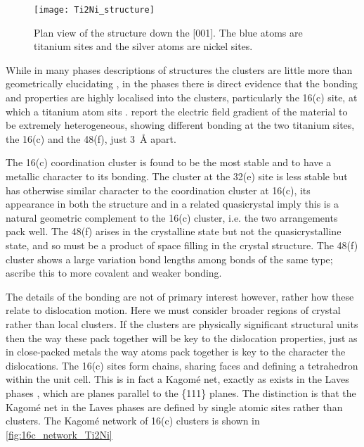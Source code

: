 \begin{figure}[h]
\centering
\texttt{[image: Ti2Ni\_structure]}
\caption[Plan view of the  structure.]{Plan view of the  structure down the [001]. The blue atoms are titanium sites and the silver atoms are nickel sites.\label{fig:Ti2Ni_plan}}
\end{figure}



While in many phases descriptions of structures the clusters are little more than geometrically elucidating \cite{Steurer2006}, in the  phases there is direct evidence that the bonding and properties are highly localised into the clusters, particularly the 16(c) site, at which a titanium atom sits \cite{Ivanovic2006}. \citet{Ivanovic2006} report the electric field gradient of the material to be extremely heterogeneous, showing different bonding at the two titanium sites, the 16(c) and the 48(f), just \SI{3}{\angstrom} apart. 

The 16(c) coordination cluster is found to be the most stable and to have a metallic character to its bonding. The cluster at the 32(e) site is less stable but has otherwise similar character to the coordination cluster at 16(c), its appearance in both the  structure and in a related quasicrystal imply this is a natural geometric complement to the 16(c) cluster, i.e. the two arrangements pack well. The 48(f) arises in the crystalline state but not the quasicrystalline state, and so must be a product of space filling in the  crystal structure. The 48(f) cluster shows a large variation bond lengths among bonds of the same type; \citet{Ivanovic2006} ascribe this to more covalent and weaker bonding.


The details of the bonding are not of primary interest however, rather how these relate to dislocation motion. Here we must consider broader regions of crystal rather than local clusters. If the clusters are physically significant structural units then the way these pack together will be key to the dislocation properties, just as in close-packed metals the way atoms pack together is key to the character the dislocations. The 16(c) sites form chains, sharing faces and defining a tetrahedron within the unit cell. This is in fact a Kagom\'{e} net, exactly as exists in the Laves phases \cite{Stein2004,Stein2005}, which are planes parallel to the \{111\} planes. The distinction is that the Kagom\'{e} net in the Laves phases are defined by single atomic sites rather than clusters. The Kagom\'{e} network of 16(c) clusters is shown in \autoref{fig:16c_network_Ti2Ni}

